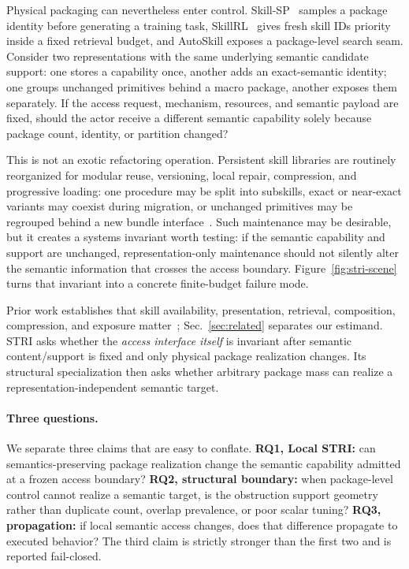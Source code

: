 Physical packaging can nevertheless enter control. Skill-SP~\citep{huang2026skill} samples a package identity before generating a training task, SkillRL~\citep{xia2026skillrl} gives fresh skill IDs priority inside a fixed retrieval budget, and AutoSkill exposes a package-level search seam. Consider two representations with the same underlying semantic candidate support: one stores a capability once, another adds an exact-semantic identity; one groups unchanged primitives behind a macro package, another exposes them separately. If the access request, mechanism, resources, and semantic payload are fixed, should the actor receive a different semantic capability solely because package count, identity, or partition changed?

This is not an exotic refactoring operation. Persistent skill libraries are routinely reorganized for modular reuse, versioning, local repair, compression, and progressive loading: one procedure may be split into subskills, exact or near-exact variants may coexist during migration, or unchanged primitives may be regrouped behind a new bundle interface~\citep{bai2026skillzip,bai2026skillzippro}. Such maintenance may be desirable, but it creates a systems invariant worth testing: if the semantic capability and support are unchanged, representation-only maintenance should not silently alter the semantic information that crosses the access boundary. Figure~\ref{fig:stri-scene} turns that invariant into a concrete finite-budget failure mode.

Prior work establishes that skill availability, presentation, retrieval, composition, compression, and exposure matter~\citep{xu2026skillavailability,jiang2026demystifying,gao2026compositional,bai2026skillzip,bai2026skillzippro,singh2018fairness,biega2018equity}; Sec.~\ref{sec:related} separates our estimand. STRI asks whether the \emph{access interface itself} is invariant after semantic content/support is fixed and only physical package realization changes. Its structural specialization then asks whether arbitrary package mass can realize a representation-independent semantic target.

\paragraph{Three questions.} We separate three claims that are easy to conflate. \textbf{RQ1, Local STRI:} can semantics-preserving package realization change the semantic capability admitted at a frozen access boundary? \textbf{RQ2, structural boundary:} when package-level control cannot realize a semantic target, is the obstruction support geometry rather than duplicate count, overlap prevalence, or poor scalar tuning? \textbf{RQ3, propagation:} if local semantic access changes, does that difference propagate to executed behavior? The third claim is strictly stronger than the first two and is reported fail-closed.

